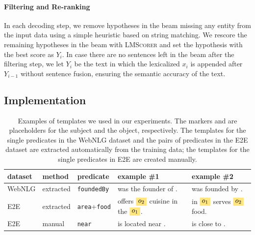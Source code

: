\paragraph{Filtering and Re-ranking} In each decoding step, we remove hypotheses in the beam missing any entity from the input data using a simple heuristic based on string matching. We rescore the remaining hypotheses in the beam with \textsc{LMScorer} and set the hypothesis with the best score as $Y_{i}$. In case there are no sentences left in the beam after the filtering step, we let $Y_{i}$ be the text in which the lexicalized $x_i$ is appended after $Y_{i-1}$ without sentence fusion, ensuring the semantic accuracy of the text.



\subsection{Implementation}
\label{sec:iterative:implementation}

\begin{table}[t]
    \centering\footnotesize
    \begin{tabular}{@{}lllll@{}}
        \textbf{dataset} & \textbf{method} & \textbf{predicate}          & \textbf{example \#1}                       & \textbf{example \#2}                \\\midrule
        WebNLG           & extracted       & \texttt{foundedBy}          & \et{} was the founder of \eh{}.            & \eh{} was founded by \et{}.         \\
        E2E              & extracted       & \texttt{area}+\texttt{food} & \eh{} offers $\ets$ cuisine in the $\etf$. & \eh{} in $\etf$ serves $\ets$ food. \\
        E2E              & manual          & \texttt{near}               & \eh{} is located near \et{}.               & \et{} is close to \eh{}.
    \end{tabular}
    \caption[Examples of templates used for our experiments.]{Examples of templates we used in our experiments. The markers \eh{} and \et{} are placeholders for the subject and the object, respectively. The templates for the single predicates in the WebNLG dataset and the pairs of predicates in the E2E dataset are extracted automatically from the training data; the templates for the single predicates in E2E are created manually.}
    \label{tab:iterative:templates_ex}
\end{table}


